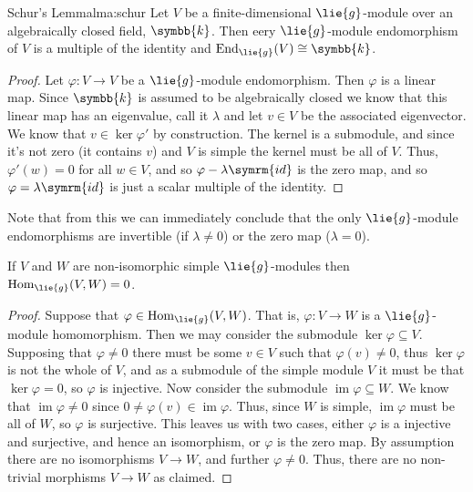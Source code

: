 \documentclass[fleqn]{NotesClass}
\renewcommand{\field}{\symbb{k}}
\DeclareMathOperator{\Hom}{Hom}
\newcommand{\isomorphic}{\cong}
\newcommand{\id}{\symrm{id}}
\DeclareMathOperator{\End}{End}
\DeclareMathOperator{\im}{im}
\begin{document}
    \begin{lma}{Schur's Lemma}{lma:schur}
        Let \(V\) be a finite-dimensional \(\lie{g}\)-module over an algebraically closed field, \(\field\).
        Then eery \(\lie{g}\)-module endomorphism of \(V\) is a multiple of the identity and \(\End_{\lie{g}}(V) \isomorphic \field\).
        \begin{proof}
            Let \(\varphi \colon V \to V\) be a \(\lie{g}\)-module endomorphism.
            Then \(\varphi\) is a linear map.
            Since \(\field\) is assumed to be algebraically closed we know that this linear map has an eigenvalue, call it \(\lambda\) and let \(v \in V\) be the associated eigenvector.
            We know that \(v \in \ker \varphi'\) by construction.
            The kernel is a submodule, and since it's not zero (it contains \(v\)) and \(V\) is simple the kernel must be all of \(V\).
            Thus, \(\varphi'(w) = 0\) for all \(w \in V\), and so \(\varphi - \lambda \id\) is the zero map, and so \(\varphi = \lambda \id\) is just a scalar multiple of the identity.
        \end{proof}
    \end{lma}
    
    Note that from this we can immediately conclude that the only \(\lie{g}\)-module endomorphisms are invertible (if \(\lambda \ne 0\)) or the zero map (\(\lambda = 0\)).
    
    \begin{lma}{}{}
        If \(V\) and \(W\) are non-isomorphic simple \(\lie{g}\)-modules then \(\Hom_{\lie{g}}(V, W) = 0\).
        \begin{proof}
            Suppose that \(\varphi \in \Hom_{\lie{g}}(V, W)\).
            That is, \(\varphi \colon V \to W\) is a \(\lie{g}\)-module homomorphism.
            Then we may consider the submodule \(\ker \varphi \subseteq V\).
            Supposing that \(\varphi \ne 0\) there must be some \(v \in V\) such that \(\varphi(v) \ne 0\), thus \(\ker \varphi\) is not the whole of \(V\), and as a submodule of the simple module \(V\) it must be that \(\ker \varphi = 0\), so \(\varphi\) is injective.
            Now consider the submodule \(\im \varphi \subseteq W\).
            We know that \(\im \varphi \ne 0\) since \(0 \ne \varphi(v) \in \im \varphi\).
            Thus, since \(W\) is simple, \(\im \varphi\) must be all of \(W\), so \(\varphi\) is surjective.
            This leaves us with two cases, either \(\varphi\) is a injective and surjective, and hence an isomorphism, or \(\varphi\) is the zero map.
            By assumption there are no isomorphisms \(V \to W\), and further \(\varphi \ne 0\).
            Thus, there are no non-trivial morphisms \(V \to W\) as claimed.
        \end{proof}
    \end{lma}
    
\end{document}
